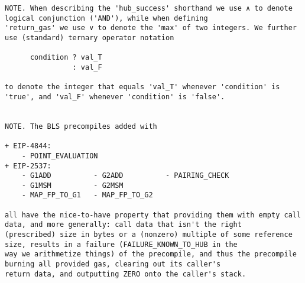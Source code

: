 \documentclass[varwidth=\maxdimen,margin=0.5cm,multi={verbatim}]{standalone}
\begin{document}
\begin{verbatim}
NOTE. When describing the 'hub_success' shorthand we use ∧ to denote logical conjunction ('AND'), while when defining
'return_gas' we use ∨ to denote the 'max' of two integers. We further use (standard) ternary operator notation

      condition ? val_T
                : val_F

to denote the integer that equals 'val_T' whenever 'condition' is 'true', and 'val_F' whenever 'condition' is 'false'.


NOTE. The BLS precompiles added with

+ EIP-4844:
    - POINT_EVALUATION
+ EIP-2537:
    - G1ADD          - G2ADD          - PAIRING_CHECK
    - G1MSM          - G2MSM
    - MAP_FP_TO_G1   - MAP_FP_TO_G2

all have the nice-to-have property that providing them with empty call data, and more generally: call data that isn't the right
(prescribed) size in bytes or a (nonzero) multiple of some reference size, results in a failure (FAILURE_KNOWN_TO_HUB in the
way we arithmetize things) of the precompile, and thus the precompile burning all provided gas, clearing out its caller's
return data, and outputting ZERO onto the caller's stack.

\end{verbatim}
\end{document}
